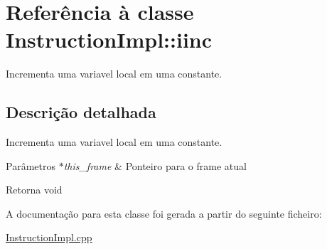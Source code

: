 \hypertarget{class_instruction_impl_1_1iinc}{}\section{Referência à classe Instruction\+Impl\+:\+:iinc}
\label{class_instruction_impl_1_1iinc}


Incrementa uma variavel local em uma constante.  




\subsection{Descrição detalhada}
Incrementa uma variavel local em uma constante. 


\begin{DoxyParams}{Parâmetros}
{\em $\ast$this\+\_\+frame} & Ponteiro para o frame atual \\
\hline
\end{DoxyParams}
\begin{DoxyReturn}{Retorna}
void 
\end{DoxyReturn}


A documentação para esta classe foi gerada a partir do seguinte ficheiro\+:\begin{DoxyCompactItemize}
\item 
\hyperlink{_instruction_impl_8cpp}{Instruction\+Impl.\+cpp}\end{DoxyCompactItemize}
